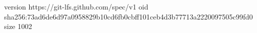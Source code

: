 version https://git-lfs.github.com/spec/v1
oid sha256:73ad6de6d97a0958829b10cd6fb0cbff101ceb4d3b77713a2220097505c99fd0
size 1002
